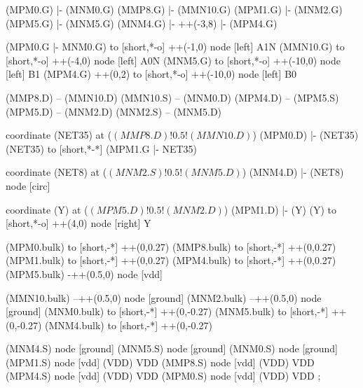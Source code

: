 \begin{circuitikz}[american]
			
	(MPM0.G) |- (MNM0.G)
	(MMP8.G) |- (MMN10.G)
	(MPM1.G) |- (MNM2.G)
	(MPM5.G) |- (MNM5.G)
	(MNM4.G) |- ++(-3,8) |- (MPM4.G)
	
	(MPM0.G |- MNM0.G) to [short,*-o] ++(-1,0) node [left] {A1N} 
	(MMN10.G) to [short,*-o] ++(-4,0) node [left] {A0N}
	(MNM5.G) to [short,*-o] ++(-10,0) node [left] {B1}
	(MPM4.G) ++(0,2) to [short,*-o] ++(-10,0) node [left] {B0}
	
	(MMP8.D) -- (MMN10.D)
	(MMN10.S) -- (MNM0.D)
	(MPM4.D) -- (MPM5.S)
	(MPM5.D) -- (MNM2.D)
	(MNM2.S) -- (MNM5.D)	
	
	coordinate (NET35) at ($(MMP8.D)!0.5!(MMN10.D)$)
	(MPM0.D) |- (NET35)
	(NET35) to [short,*-*] (MPM1.G |- NET35)
	
	coordinate (NET8) at ($(MNM2.S)!0.5!(MNM5.D)$)
	(MNM4.D) |- (NET8) node [circ] {}
	
	coordinate (Y) at ($(MPM5.D)!0.5!(MNM2.D)$)
	(MPM1.D) |- (Y)
	(Y) to [short,*-o] ++(4,0) node [right] {Y}
	
	(MPM0.bulk) to [short,-*] ++(0,0.27)
	(MMP8.bulk) to [short,-*] ++(0,0.27)
	(MPM1.bulk) to [short,-*] ++(0,0.27)
	(MPM4.bulk) to [short,-*] ++(0,0.27)
	(MPM5.bulk) -++(0.5,0) node [vdd]{}
	
	(MMN10.bulk) --++(0.5,0) node [ground]{}
	(MNM2.bulk) --++(0.5,0) node [ground]{}
	(MNM0.bulk) to [short,-*] ++(0,-0.27)	
	(MNM5.bulk) to [short,-*] ++(0,-0.27)
	(MNM4.bulk) to [short,-*] ++(0,-0.27)


	(MNM4.S) node [ground] {}
	(MNM5.S) node [ground] {}
	(MNM0.S) node [ground] {}
	(MPM1.S) node [vdd] (VDD) {VDD}
	(MMP8.S) node [vdd] (VDD) {VDD}
	(MPM4.S) node [vdd] (VDD) {VDD}
	(MPM0.S) node [vdd] (VDD) {VDD}
;

\end{circuitikz}
